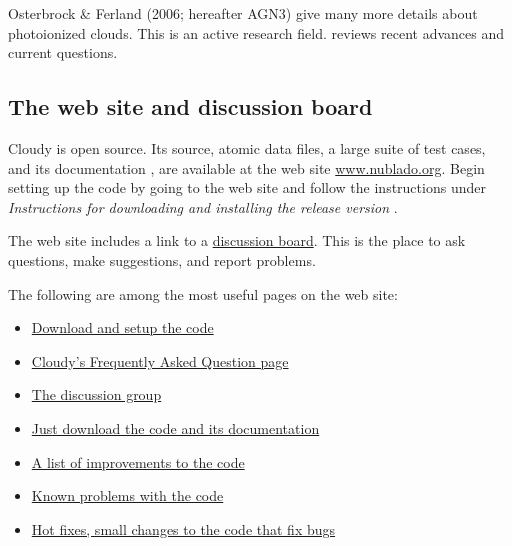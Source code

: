 \documentclass[12pt,twoside]{article}
\begin{document}
{Osterbrock \& Ferland (2006; hereafter AGN3) give many more details
about photoionized clouds.
This is an active research field.
\citet{Ferland03} reviews recent advances and
current questions.

\subsection{The web site and discussion board}

Cloudy is open source.  Its source, atomic data files, a large suite
of test cases, and its documentation \Hazy, are available at the web site
\href{http://www.nublado.org}{www.nublado.org}.
Begin setting up the code by going to the
web site and
follow the instructions under
\emph{Instructions for downloading and installing the release version }.

The web site includes a link to a 
\href{https:cloudyastrophysics.groups.io}{discussion board}.  This is the place
to ask questions, make suggestions, and report problems.

The following are among the most useful pages on the web site:
%
\begin{itemize}

\item 
\href{https://gitlab.nublado.org/cloudy/cloudy/-/wikis/StepByStep}
     {Download and setup the code}

\item
\href{https://gitlab.nublado.org/cloudy/cloudy/-/wikis/Frequently-asked-Questions-about-Cloudy}
     {Cloudy's Frequently Asked Question page}

\item
\href{https://cloudyastrophysics.groups.io}{The discussion group}

\item
\href{https://gitlab.nublado.org/cloudy/cloudy/-/wikis/DownloadLinks}
     {Just download the code and its documentation}

\item
\href{https://gitlab.nublado.org/cloudy/cloudy/-/wikis/RevisionHistory}
     {A list of improvements to the code}

\item
\href{https://gitlab.nublado.org/cloudy/cloudy/-/wikis/KnownProblems}
     {Known problems with the code}

\item
\href{https://gitlab.nublado.org/cloudy/cloudy/-/wikis/HotFixes}
     {Hot fixes, small changes to the code that fix bugs}
\end{itemize}

}
\end{document}
